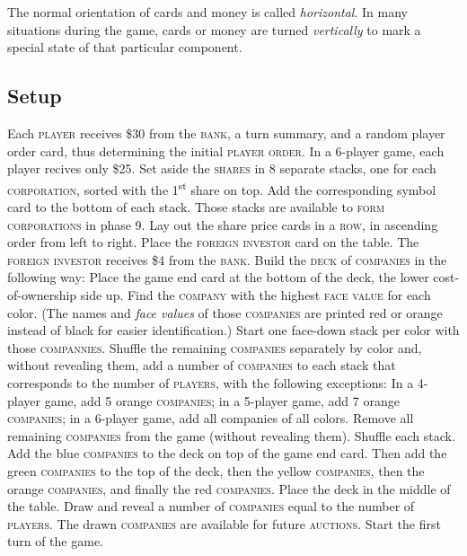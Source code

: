\documentclass[11pt,a4paper]{article}
\begin{document}
\begin{multicols}{2}
{The normal orientation of cards and money is called
\emph{horizontal}. In many situations during the game, cards or money
are turned \emph{vertically} to mark a special state of that
particular component.


\subsection*{Setup}

Each \textsc{player} receives \$30 from the \textsc{bank}, a turn
summary, and a random player order card, thus determining the initial
\textsc{player order}. In a 6-player game, each player recives only
\$25. Set aside the \textsc{shares} in 8 separate stacks, one for each
\textsc{corporation}, sorted with the 1\textsuperscript{st} share on
top. Add the corresponding symbol card to the bottom of each
stack. Those stacks are available to \textsc{form corporations} in
phase 9. Lay out the share price cards in a \textsc{row}, in ascending
order from left to right. Place the \textsc{foreign investor} card on
the table. The \textsc{foreign investor} receives \$4 from the
\textsc{bank}. Build the \textsc{deck} of \textsc{companies} in the
following way: Place the game end card at the bottom of the deck, the
lower cost-of-ownership side up. Find the \textsc{company} with the
highest \textsc{face value} for each color. (The names and \emph{face
  values} of those \textsc{companies} are printed red or orange
instead of black for easier identification.) Start one face-down stack
per color with those \textsc{compannies}. Shuffle the remaining
\textsc{companies} separately by color and, without revealing them,
add a number of \textsc{companies} to each stack that corresponds to
the number of \textsc{players}, with the following exceptions: In a
4-player game, add 5 orange \textsc{companies}; in a 5-player game,
add 7 orange \textsc{companies}; in a 6-player game, add all companies
of all colors. Remove all remaining \textsc{companies} from the game
(without revealing them). Shuffle each stack. Add the blue
\textsc{companies} to the deck on top of the game end card. Then add
the green \textsc{companies} to the top of the deck, then the yellow
\textsc{companies}, then the orange \textsc{companies}, and finally
the red \textsc{companies}. Place the deck in the middle of the
table. Draw and reveal a number of \textsc{companies} equal to the
number of \textsc{players}. The drawn \textsc{companies} are available
for future \textsc{auctions}. Start the first turn of the game.

}
\end{multicols}
\end{document}

